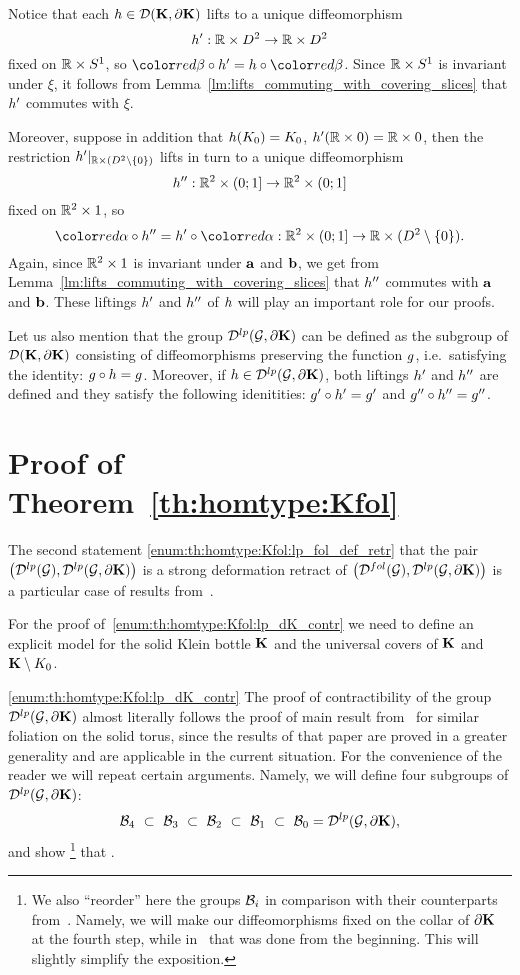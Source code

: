 Notice that each $h\in\mathcal{D}(\mathbf{K},\partial\mathbf{K})$ lifts to a unique diffeomorphism 
\[ 
    h':\mathbb{R}\times D^2\to \mathbb{R}\times D^2
\]
fixed on $\mathbb{R}\times S^1$, so $\prFromDiskToKlein\circ\tdif = \dif\circ\prFromDiskToKlein$.
Since $\mathbb{R}\times S^1$ is invariant under $\xi$, it follows from Lemma~\ref{lm:lifts_commuting_with_covering_slices} that $h'$ commutes with $\xi$.

Moreover, suppose in addition that $h(K_{0})=K_{0}$, $h'(\mathbb{R}\times0)=\mathbb{R}\times0$, then the restriction $h'|_{\mathbb{R}\times(D^2\setminus\{0\})}$ lifts in turn to a unique diffeomorphism 
\[
    h'':\mathbb{R}^2\times(0;1]\to\mathbb{R}^2\times(0;1]
\]
fixed on $\mathbb{R}^2\times1$, so
\[ \prFromPlaneToDisk\circ\ttdif = \tdif\circ\prFromPlaneToDisk:\bR^2\times(0;1] \to \DzxR. \]
Again, since $\mathbb{R}^2\times1$ is invariant under $\mathbf{a}$ and $\mathbf{b}$, we get from Lemma~\ref{lm:lifts_commuting_with_covering_slices} that $h''$ commutes with $\mathbf{a}$ and $\mathbf{b}$.
These liftings $h'$ and $h''$ of $h$ will play an important role for our proofs.

Let us also mention that the group $\mathcal{D}^{lp}(\mathcal{G},\partial\mathbf{K})$ can be defined as the subgroup of $\mathcal{D}(\mathbf{K},\partial\mathbf{K})$ consisting of diffeomorphisms preserving the function $g$, i.e.\ satisfying the identity: $g\circ h=g$.
Moreover, if $h\in\mathcal{D}^{lp}(\mathcal{G},\partial\mathbf{K})$, both liftings $h'$ and $h''$ are defined and they satisfy the following idenitities: $g'\circ h'=g'$ and $g''\circ h''=g''$.


\section{Proof of Theorem~\ref{th:homtype:Kfol}}\label{sect:proof:th:homtype:Kfol}
The second statement \ref{enum:th:homtype:Kfol:lp_fol_def_retr} that the pair $\bigl(\mathcal{D}^{lp}(\mathcal{G}), \mathcal{D}^{lp}(\mathcal{G},\partial\mathbf{K}) \bigr)$ is a strong deformation retract of $\bigl(\mathcal{D}^{fol}(\mathcal{G}), \mathcal{D}^{lp}(\mathcal{G},\partial\mathbf{K}) \bigr)$ is a particular case of results from~\cite{Maksymenko:lens:2023}.

For the proof of~\ref{enum:th:homtype:Kfol:lp_dK_contr} we need to define an explicit model for the solid Klein bottle $\mathbf{K}$ and the universal covers of $\mathbf{K}$ and $\mathbf{K}\setminus K_{0}$.

\ref{enum:th:homtype:Kfol:lp_dK_contr}
The proof of contractibility of the group $\mathcal{D}^{lp}(\mathcal{G},\partial\mathbf{K})$ almost literally follows the proof of main result from~\cite{KhokhliukMaksymenko:lens:2022} for similar foliation on the solid torus, since the results of that paper are proved in a greater generality and are applicable in the current situation.
For the convenience of the reader we will repeat certain arguments.
Namely, we will define four subgroups of $\mathcal{D}^{lp}(\mathcal{G},\partial\mathbf{K})$:
\[
    \mathcal{B}_{ 4 }      \ \subset \
    \mathcal{B}_{ 3 }       \ \subset \
    \mathcal{B}_{ 2 }            \ \subset \
    \mathcal{B}_{ 1 }          \ \subset \
    \mathcal{B}_{ 0 } = \mathcal{D}^{lp}(\mathcal{G},\partial\mathbf{K}),
\]
and show%
\footnote{We also ``reorder'' here the groups $\mathcal{B}_{i}$ in comparison with their counterparts from~\cite{KhokhliukMaksymenko:lens:2022}.
Namely, we will make our diffeomorphisms fixed on the collar of $\partial\mathbf{K}$ at the fourth step, while in~\cite{KhokhliukMaksymenko:lens:2022} that was done from the beginning.
This will slightly simplify the exposition.}
that .

